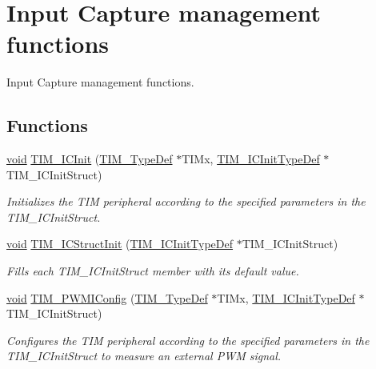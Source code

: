\hypertarget{group___t_i_m___group3}{\section{Input Capture management functions}
\label{group___t_i_m___group3}
}


Input Capture management functions.  


\subsection*{Functions}
\begin{DoxyCompactItemize}
\item 
\hyperlink{group___n_a_m_e_ga18028b8badbf1ea7e704ccac3c488e82}{void} \hyperlink{group___t_i_m___group3_ga9e6a153dd6552e4e1188eba227316f7f}{T\-I\-M\-\_\-\-I\-C\-Init} (\hyperlink{struct_t_i_m___type_def}{T\-I\-M\-\_\-\-Type\-Def} $\ast$T\-I\-Mx, \hyperlink{struct_t_i_m___i_c_init_type_def}{T\-I\-M\-\_\-\-I\-C\-Init\-Type\-Def} $\ast$T\-I\-M\-\_\-\-I\-C\-Init\-Struct)
\begin{DoxyCompactList}\small\item\em Initializes the T\-I\-M peripheral according to the specified parameters in the T\-I\-M\-\_\-\-I\-C\-Init\-Struct. \end{DoxyCompactList}\item 
\hyperlink{group___n_a_m_e_ga18028b8badbf1ea7e704ccac3c488e82}{void} \hyperlink{group___t_i_m___group3_ga5005dac8e4e8a4c7fc2a0ef05b77cc50}{T\-I\-M\-\_\-\-I\-C\-Struct\-Init} (\hyperlink{struct_t_i_m___i_c_init_type_def}{T\-I\-M\-\_\-\-I\-C\-Init\-Type\-Def} $\ast$T\-I\-M\-\_\-\-I\-C\-Init\-Struct)
\begin{DoxyCompactList}\small\item\em Fills each T\-I\-M\-\_\-\-I\-C\-Init\-Struct member with its default value. \end{DoxyCompactList}\item 
\hyperlink{group___n_a_m_e_ga18028b8badbf1ea7e704ccac3c488e82}{void} \hyperlink{group___t_i_m___group3_gaa71f9296556310f85628d6c748a06475}{T\-I\-M\-\_\-\-P\-W\-M\-I\-Config} (\hyperlink{struct_t_i_m___type_def}{T\-I\-M\-\_\-\-Type\-Def} $\ast$T\-I\-Mx, \hyperlink{struct_t_i_m___i_c_init_type_def}{T\-I\-M\-\_\-\-I\-C\-Init\-Type\-Def} $\ast$T\-I\-M\-\_\-\-I\-C\-Init\-Struct)
\begin{DoxyCompactList}\small\item\em Configures the T\-I\-M peripheral according to the specified parameters in the T\-I\-M\-\_\-\-I\-C\-Init\-Struct to measure an external P\-W\-M signal. \end{DoxyCompactList}\item 

\end{DoxyCompactItemize}
